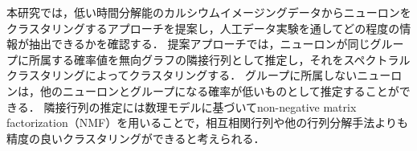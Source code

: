 本研究では，低い時間分解能のカルシウムイメージングデータからニューロンをクラスタリングするアプローチを提案し，人工データ実験を通してどの程度の情報が抽出できるかを確認する．
提案アプローチでは，ニューロンが同じグループに所属する確率値を無向グラフの隣接行列として推定し，それをスペクトラルクラスタリングによってクラスタリングする．
グループに所属しないニューロンは，他のニューロンとグループになる確率が低いものとして推定することができる．
隣接行列の推定には数理モデルに基づいてnon-negative matrix factorization（NMF）を用いることで，相互相関行列や他の行列分解手法よりも精度の良いクラスタリングができると考えられる．
